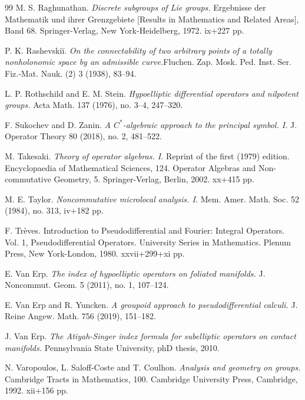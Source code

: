 \documentclass[leqno]{amsart}
\begin{document}
\begin{thebibliography}{99}
M. S. Raghunathan. 
{\it Discrete subgroups of Lie groups.} Ergebnisse der Mathematik und ihrer Grenzgebiete [Results in Mathematics and Related Areas], Band 68. Springer-Verlag, New York-Heidelberg, 1972. ix+227 pp.

P. K. Rashevskiĭ.
{\it On the connectability of two arbitrary points of a totally nonholonomic space by an admissible curve.}Fluchen. Zap. Mosk. Ped. Inst. Ser. Fiz.-Mat. Nauk. (2) 3 (1938), 83--94.

L. P. Rothschild and E. M. Stein. 
{\it Hypoelliptic differential operators and nilpotent groups.} 
Acta Math. 137 (1976), no. 3--4, 247--320.

F. Sukochev and D. Zanin. 
{\it A $C^{\ast}$-algebraic approach to the principal symbol. I.} 
J. Operator Theory 80 (2018), no. 2, 481--522.

M. Takesaki. 
{\it Theory of operator algebras. I.} 
Reprint of the first (1979) edition. Encyclopaedia of Mathematical Sciences, 124. Operator Algebras and Non-commutative Geometry, 5. Springer-Verlag, Berlin, 2002. xx+415 pp.


M. E. Taylor. 
{\it Noncommutative microlocal analysis. I.} 
Mem. Amer. Math. Soc. 52 (1984), no. 313, iv+182 pp.

F. Trèves.
{Introduction to Pseudodifferential and Fourier: Integral Operators.} Vol. 1, Pseudodifferential Operators. University Series in Mathematics. Plenum Press, New York-London, 1980. xxvii+299+xi pp.

E. Van Erp.
{\it The index of hypoelliptic operators on foliated manifolds.} 
J. Noncommut. Geom. 5 (2011), no. 1, 107--124.

E. Van Erp and R. Yuncken. 
{\it A groupoid approach to pseudodifferential calculi.} 
J. Reine Angew. Math. 756 (2019), 151--182.

J. Van Erp. 
{\it The Atiyah-Singer index formula for subelliptic operators on contact manifolds.} 
Pennsylvania State University, phD thesis, 2010.

N. Varopoulos, L. Saloff-Coste and T. Coulhon. 
{\it Analysis and geometry on groups.} 
Cambridge Tracts in Mathematics, 100. Cambridge University Press, Cambridge, 1992. xii+156 pp. 






\end{thebibliography}
\end{document}
